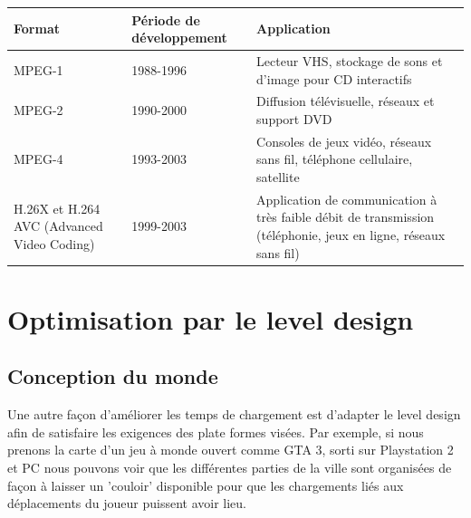 \documentclass[a4paper, 11pt]{article} %
\begin{document}
\begin{center}
	\begin{tabular}{|p{}|p{}|p{}|}
		\hline
		Format & Période de développement & Application\\
		\hline
		MPEG-1&1988-1996&Lecteur VHS, stockage de sons et d'image pour CD interactifs\\
		MPEG-2&1990-2000&Diffusion télévisuelle, réseaux et support DVD\\
		MPEG-4&1993-2003&Consoles de jeux vidéo, réseaux sans fil, téléphone cellulaire, satellite\\
		H.26X et H.264 AVC (Advanced Video Coding)&1999-2003&Application de communication à très faible débit de transmission (téléphonie, jeux en ligne, réseaux sans fil)\\
		\hline
	\end{tabular}
\end{center}


\newpage
\section{Optimisation par le level design}
\subsection{Conception du monde}
Une autre façon d'améliorer les temps de chargement est d'adapter le level design afin de satisfaire les exigences des plate formes visées. Par exemple, si nous prenons la carte d'un jeu à monde ouvert comme GTA 3, sorti sur Playstation 2 et PC nous pouvons voir que les différentes parties de la ville sont organisées de façon à laisser un 'couloir' disponible pour que les chargements liés aux déplacements du joueur puissent avoir lieu.
\end{document}
